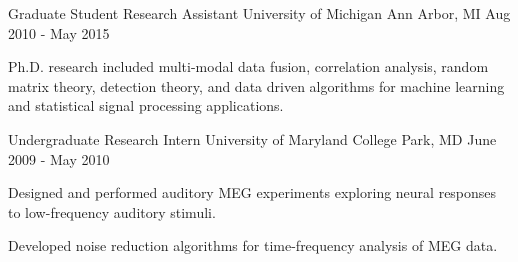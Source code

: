 

\begin{cventries}

  \cventry
    {Graduate Student Research Assistant} %
    {University of Michigan} %
    {Ann Arbor, MI} %
    {Aug 2010 - May 2015} %
    {
      \begin{cvitems} %
      \item {Ph.D. research included multi-modal data fusion, correlation analysis, random
          matrix theory, detection theory, and data driven algorithms for machine learning and statistical
          signal processing applications.}
      \end{cvitems}
    }

  \cventry
    {Undergraduate Research Intern} %
    {University of Maryland} %
    {College Park, MD} %
    {June 2009 - May 2010} %
    {
      \begin{cvitems} %
      \item {Designed and performed auditory MEG experiments exploring neural responses to
          low-frequency auditory stimuli.}
      \item {Developed noise reduction algorithms for time-frequency analysis of MEG data.}
      \end{cvitems}
    }

\end{cventries}
